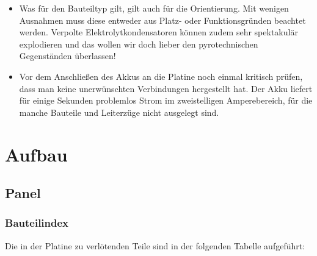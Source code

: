 \documentclass[paper=a4, open=any, numbers=noenddot]{scrbook}
\begin{document}
\begin{itemize}
				\item
				      Was für den Bauteiltyp gilt, gilt auch für die Orientierung. Mit wenigen Ausnahmen muss diese entweder aus Platz- oder Funktionsgründen beachtet werden. Verpolte Elektrolytkondensatoren können zudem sehr spektakulär explodieren und das wollen wir doch lieber den pyrotechnischen Gegenständen überlassen!
				\item
				      Vor dem Anschließen des Akkus an die Platine noch einmal kritisch prüfen, dass man keine unerwünschten Verbindungen hergestellt hat. Der Akku liefert für einige Sekunden problemlos Strom im zweistelligen Amperebereich, für die manche Bauteile und Leiterzüge nicht ausgelegt sind.
			\end{itemize}

	\chapter{Aufbau}

		\section{Panel}

			\subsection*{Bauteilindex}

				Die in der Platine zu verlötenden Teile sind in der folgenden Tabelle aufgeführt:
\end{document}
